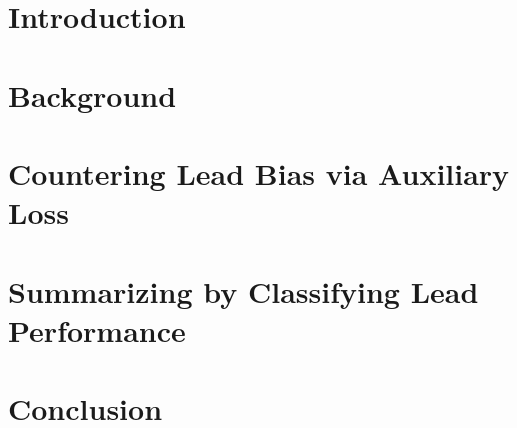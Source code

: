 \documentclass[12pt, oneside, extrafontsizes]{memoir}  %
\theoremstyle{plain}
\theoremstyle{definition}
\begin{document}
\chapter{Introduction}


\chapter{Background}
\label{chap:relatedwork}


% 

\chapter{Countering Lead Bias via Auxiliary Loss}
\label{chap:aux_loss}


\chapter{Summarizing by Classifying Lead Performance}


\chapter{Conclusion}


%
%
\printbibliography
\end{document}

